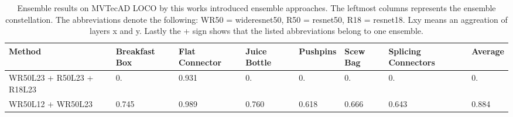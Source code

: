 \begin{table}[htbp]
    \tiny
    \centering
    \begin{tabularx}{\textwidth}{|X|X|X|X|X|X|X|X|}%
        \hline
        \textbf{Method} & \textbf{Breakfast Box} & \textbf{Flat Connector} & \textbf{Juice Bottle} & \textbf{Pushpins} & \textbf{Scew Bag} & \textbf{Splicing Connectors} & \textbf{Average} \\
        \hline
        WR50L23 + R50L23 + R18L23  & 0. & 0.931 & 0. & 0. & 0. & 0. & 0. \\
        \hline
        WR50L12 + WR50L23 & 0.745 & 0.989 & 0.760 & 0.618 & 0.666 & 0.643 & 0.884 \\
        \hline
    \end{tabularx}
    \caption{Ensemble results on MVTecAD LOCO \cite{LOCODentsAndScratchesBergmann2022} by this works introduced ensemble approaches. The leftmost columns represents the ensemble 
             constellation. The abbreviations denote the following: 
             WR50 = wideresnet50, R50 = resnet50, R18 = resnet18. Lxy means an aggreation of layers x and y. Lastly the + sign shows that the listed abbreviations belong to one ensemble.}
    \label{tab:ensembleimageAUROC}
\end{table}






